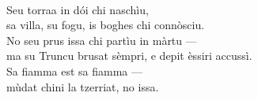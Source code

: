 \begin{lyrics}
\\
Seu torraa in dói chi naschìu,\\
sa villa, su fogu, is boghes chi connòsciu.\\
No seu prus issa chi partìu in màrtu —\\
ma su Truncu brusat sèmpri, e depit èssiri accussì.
\\
Sa fiamma est sa fiamma —\\
mùdat chini la tzerriat, no issa.


\end{lyrics}

